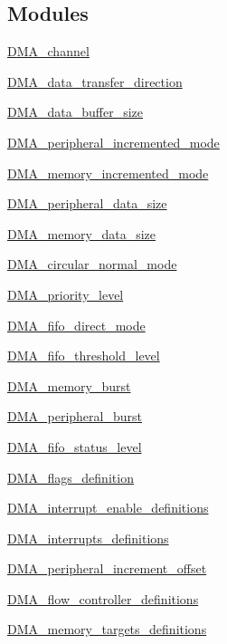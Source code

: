 \subsection*{Modules}
\begin{DoxyCompactItemize}
\item 
\hyperlink{group___d_m_a__channel}{D\+M\+A\+\_\+channel}
\item 
\hyperlink{group___d_m_a__data__transfer__direction}{D\+M\+A\+\_\+data\+\_\+transfer\+\_\+direction}
\item 
\hyperlink{group___d_m_a__data__buffer__size}{D\+M\+A\+\_\+data\+\_\+buffer\+\_\+size}
\item 
\hyperlink{group___d_m_a__peripheral__incremented__mode}{D\+M\+A\+\_\+peripheral\+\_\+incremented\+\_\+mode}
\item 
\hyperlink{group___d_m_a__memory__incremented__mode}{D\+M\+A\+\_\+memory\+\_\+incremented\+\_\+mode}
\item 
\hyperlink{group___d_m_a__peripheral__data__size}{D\+M\+A\+\_\+peripheral\+\_\+data\+\_\+size}
\item 
\hyperlink{group___d_m_a__memory__data__size}{D\+M\+A\+\_\+memory\+\_\+data\+\_\+size}
\item 
\hyperlink{group___d_m_a__circular__normal__mode}{D\+M\+A\+\_\+circular\+\_\+normal\+\_\+mode}
\item 
\hyperlink{group___d_m_a__priority__level}{D\+M\+A\+\_\+priority\+\_\+level}
\item 
\hyperlink{group___d_m_a__fifo__direct__mode}{D\+M\+A\+\_\+fifo\+\_\+direct\+\_\+mode}
\item 
\hyperlink{group___d_m_a__fifo__threshold__level}{D\+M\+A\+\_\+fifo\+\_\+threshold\+\_\+level}
\item 
\hyperlink{group___d_m_a__memory__burst}{D\+M\+A\+\_\+memory\+\_\+burst}
\item 
\hyperlink{group___d_m_a__peripheral__burst}{D\+M\+A\+\_\+peripheral\+\_\+burst}
\item 
\hyperlink{group___d_m_a__fifo__status__level}{D\+M\+A\+\_\+fifo\+\_\+status\+\_\+level}
\item 
\hyperlink{group___d_m_a__flags__definition}{D\+M\+A\+\_\+flags\+\_\+definition}
\item 
\hyperlink{group___d_m_a__interrupt__enable__definitions}{D\+M\+A\+\_\+interrupt\+\_\+enable\+\_\+definitions}
\item 
\hyperlink{group___d_m_a__interrupts__definitions}{D\+M\+A\+\_\+interrupts\+\_\+definitions}
\item 
\hyperlink{group___d_m_a__peripheral__increment__offset}{D\+M\+A\+\_\+peripheral\+\_\+increment\+\_\+offset}
\item 
\hyperlink{group___d_m_a__flow__controller__definitions}{D\+M\+A\+\_\+flow\+\_\+controller\+\_\+definitions}
\item 
\hyperlink{group___d_m_a__memory__targets__definitions}{D\+M\+A\+\_\+memory\+\_\+targets\+\_\+definitions}
\end{DoxyCompactItemize}
